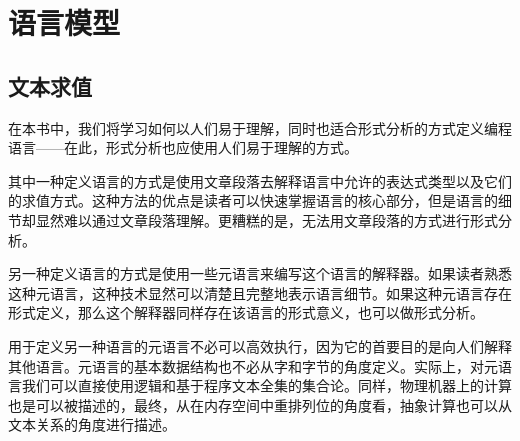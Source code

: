 \documentclass{book}
\begin{document}
\part{语言模型}
\chapter{文本求值}
在本书中，我们将学习如何以人们易于理解，同时也适合形式分析的方式定义编程语言——在此，形式分析也应使用人们易于理解的方式。\par
其中一种定义语言的方式是使用文章段落去解释语言中允许的表达式类型以及它们的求值方式。这种方法的优点是读者可以快速掌握语言的核心部分，但是语言的细节却显然难以通过文章段落理解。更糟糕的是，无法用文章段落的方式进行形式分析。\par
另一种定义语言的方式是使用一些元语言来编写这个语言的解释器。如果读者熟悉这种元语言，这种技术显然可以清楚且完整地表示语言细节。如果这种元语言存在形式定义，那么这个解释器同样存在该语言的形式意义，也可以做形式分析。\par
用于定义另一种语言的元语言不必可以高效执行，因为它的首要目的是向人们解释其他语言。元语言的基本数据结构也不必从字和字节的角度定义。实际上，对元语言我们可以直接使用逻辑和基于程序文本全集的集合论。同样，物理机器上的计算也是可以被描述的，最终，从在内存空间中重排列位的角度看，抽象计算也可以从文本关系的角度进行描述。\par
\end{document}
